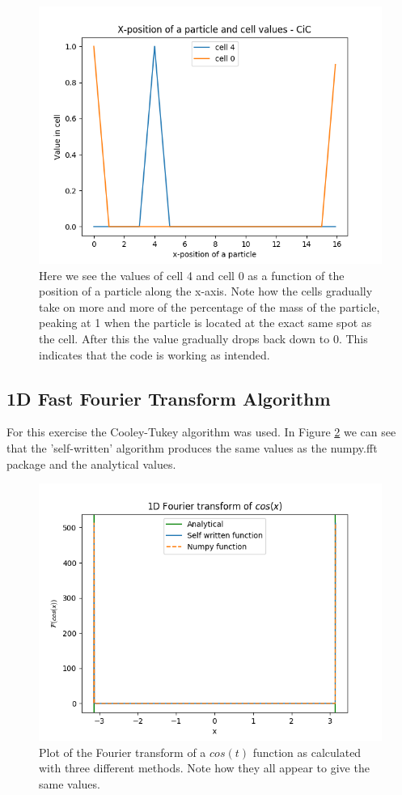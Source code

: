 \documentclass[a4paper,10pt]{article}
\begin{document}
\begin{figure}[h!]
  \centering
  \includegraphics[width=0.7\linewidth]{./plots/5d.png}
  \caption{Here we see the values of cell 4 and cell 0 as a function of the position of a particle along the x-axis. Note how the cells gradually take on more and more of the percentage of the mass of the particle, peaking at 1 when the particle is located at the exact same spot as the cell. After this the value gradually drops back down to 0.  This indicates that the code is working as intended.}
  \label{fig:5d}
\end{figure}

\subsection{1D Fast Fourier Transform Algorithm}

For this exercise the Cooley-Tukey algorithm was used. In Figure \ref{fig:5e} we can see that the 'self-written' algorithm produces the same values as the numpy.fft package and the analytical values. 

\begin{figure}[h!]
  \centering
  \includegraphics[width=0.7\linewidth]{./plots/5e.png}
  \caption{Plot of the Fourier transform of a $cos(t)$ function as calculated with three different methods. Note how they all appear to give the same values.}
  \label{fig:5e}
\end{figure}
\end{document}
